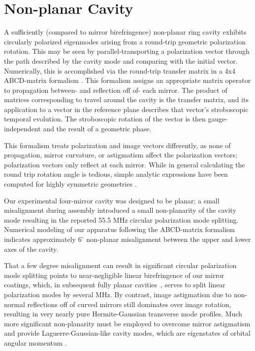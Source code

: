 \documentclass[aps,pra,twocolumn,groupedaddress,10pt,showpacs]{revtex4-1}
\begin{document}



\appendix
\section{Non-planar Cavity}
\label{App:NPC}
A sufficiently (compared to mirror birefringence) non-planar ring cavity exhibits circularly polarized eigenmodes arising from a round-trip geometric polarization rotation. This may be seen by parallel-transporting a polarization vector through the path described by the cavity mode and comparing with the initial vector. Numerically, this is accomplished via the round-trip transfer matrix in a 4x4 ABCD-matrix formalism \cite{schine2016synthetic}. This formalism assigns an appropriate matrix operator to propagation between- and reflection off of- each mirror. The product of matrices corresponding to travel around the cavity is the transfer matrix, and its application to a vector in the reference plane describes that vector's stroboscopic temporal evolution. The stroboscopic rotation of the vector is then gauge-independent and the result of a geometric phase.

This formalism treats polarization and image vectors differently, as none of propagation, mirror curvature, or astigmatism affect the polarization vectors; polarization vectors only reflect at each mirror. While in general calculating the round trip rotation angle is tedious, simple analytic expressions have been computed for highly symmetric geometries \cite{sommer2016engineering}.

Our experimental four-mirror cavity was designed to be planar; a small misalignment during assembly introduced a small non-planarity of the cavity mode resulting in the reported 55.5 MHz circular polarization mode splitting. Numerical modeling of our apparatus following the ABCD-matrix formalism indicates approximately $6^{\circ}$ non-planar misalignment between the upper and lower axes of the cavity. 

That a few degree misalignment can result in significant circular polarization mode splitting points to near-negligible linear birefringence of our mirror coatings, which, in subsequent fully planar cavities~\cite{jia2017strongly}, serves to split linear polarization modes by several MHz. By contrast, image astigmatism due to non-normal reflections off of curved mirrors still dominates over image rotation, resulting in very nearly pure Hermite-Gaussian transverse mode profiles. Much more significant non-planarity must be employed to overcome mirror astigmatism and provide Laguerre-Gaussian-like cavity modes, which are eigenstates of orbital angular momentum \cite{schine2016synthetic}.
\end{document}
